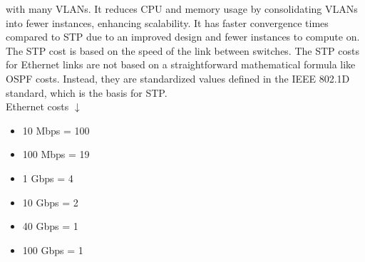 \documentclass{article}
\begin{document}
with many VLANs. It reduces CPU and memory usage by consolidating VLANs into fewer instances, enhancing scalability. It has faster convergence times compared to STP due to an improved design and fewer instances to compute on.\\
	
The STP cost is based on the speed of the link between switches. The STP costs for Ethernet links are not based on a straightforward mathematical formula like OSPF costs. Instead, they are standardized values defined in the IEEE 802.1D standard, which is the basis for STP.\\

Ethernet costs $\downarrow$
\begin{itemize}
\item 10 Mbps = 100
\item 100 Mbps = 19
\item 1 Gbps = 4
\item 10 Gbps = 2
\item 40 Gbps = 1
\item 100 Gbps = 1
\end{itemize}
	
\end{document}
